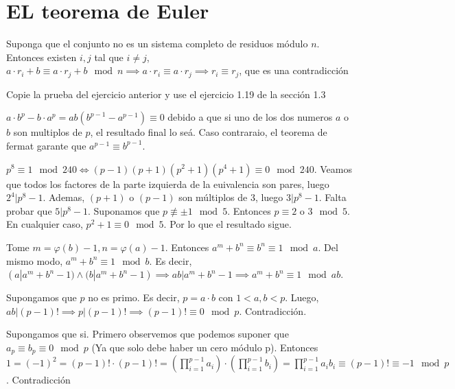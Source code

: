 \section{EL teorema de Euler}

\begin{sol}
	Suponga que el conjunto no es un sistema completo de residuos m\'odulo $n$. Entonces existen $i, j$ tal que $i\neq j$, $a\cdot r_{i}+b \equiv a \cdot r_{j}+b \mod n \implies a \cdot r_{i} \equiv a \cdot r_{j} \implies r_{i} \equiv r_{j}$, que es una contradicci\'on
\end{sol}

\begin{sol}
	Copie la prueba del ejercicio anterior y use el ejercicio 1.19 de la secci\'on 1.3
\end{sol}

\begin{sol}
	$a\cdot b^{p} - b \cdot a^{p} = ab(b^{p-1}-a^{p-1}) \equiv 0 $ debido a que si uno de los dos numeros $a$ o $b$ son multiplos de $p$, el resultado final lo se\'a. Caso contraraio, el teorema de fermat garante que $a^{p-1} \equiv b^{p-1}$. 
\end{sol}

\begin{sol}
	$p^{8} \equiv 1 \mod 240 \iff (p-1)(p+1)(p^2+1)(p^4+1) \equiv 0 \mod 240$. Veamos que todos los factores de la parte izquierda de la euivalencia son pares, luego $2^4 | p^8-1$. Ademas, $(p+1)$ o $(p-1)$ son m\'ultiplos de 3, luego $3|p^8-1$. Falta probar que $5|p^8-1$. Suponamos que $p \not \equiv \pm 1 \mod 5$. Entonces $p \equiv 2$ o $3 \mod 5$. En cualquier caso, $p^2+1 \equiv 0 \mod 5$. Por lo que el resultado sigue.
\end{sol}

\begin{sol}
	Tome $m = \varphi(b)-1, n = \varphi(a)-1$. Entonces $a^m +b^n \equiv b^n \equiv 1 \mod a$. Del mismo modo, $a^m + b^n \equiv 1 \mod b$. Es decir, $(a| a^m+b^n-1) \land (b| a^m+b^n-1) \implies ab | a^m+b^n-1 \implies a^m+b^n \equiv 1 \mod ab$.
\end{sol}

\begin{sol}
	Supongamos que $p$ no es primo. Es decir, $p = a\cdot b$ con $1<a, b<p$. Luego, $ab | (p-1)! \implies p | (p-1)! \implies (p-1)! \equiv 0 \mod p$. Contradicci\'on.
\end{sol}

\begin{sol}
	Supongamos que si. Primero observemos que podemos suponer que $a_{p} \equiv b_{p} \equiv 0 \mod p$ (Ya que solo debe haber un cero m\'odulo p). Entonces $1 =(-1)^2=(p-1)!\cdot (p-1)! =(\prod_{i=1}^{p-1}a_{i})\cdot (\prod_{i=1}^{p-1}b_{i}) = \prod_{i =1}^{p-1} a_{i}b_{i} \equiv (p-1)! \equiv -1 \mod p$. Contradicci\'on
\end{sol}

